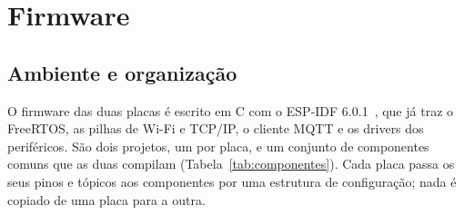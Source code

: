 \section{Firmware}\label{sec:firmware}
\subsection{Ambiente e organização}

O firmware das duas placas é escrito em C com o ESP-IDF 6.0.1~\cite{espidf}, que já traz o
FreeRTOS, as pilhas de Wi-Fi e TCP/IP, o cliente MQTT e os drivers dos periféricos. São dois
projetos, um por placa, e um conjunto de componentes comuns que as duas compilam
(Tabela~\ref{tab:componentes}). Cada placa passa os seus pinos e tópicos aos componentes por
uma estrutura de configuração; nada é copiado de uma placa para a outra.

